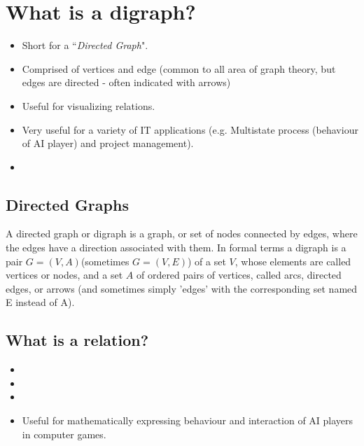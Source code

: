 \documentclass[]{report}
\begin{document}


\section{What is a digraph?}
\begin{itemize}
\item Short for a ``\textit{Directed Graph}".
\item Comprised of vertices and edge (common to all area of graph theory, but edges are directed - often indicated with arrows)
\item Useful for visualizing relations.
\item Very useful for a variety of IT applications (e.g. Multistate process (behaviour of AI player) and project management).
\item 
\end{itemize}
\subsection*{Directed Graphs}
A directed graph or digraph is a graph, or set of nodes connected by edges, where
 the edges have a direction associated with them. In formal terms a digraph is a pair $G=(V,A)$(sometimes $G=(V,E)$) of a set $V$, whose elements are called vertices or nodes, and a set $A$ of ordered pairs of vertices, called arcs, directed edges, or arrows (and sometimes simply 'edges' with the corresponding set named E instead of A).

\subsection{What is a relation?}
\begin{itemize}
\item 
\item 
\item 
\item Useful for mathematically expressing behaviour and interaction of AI players in computer games.
\end{itemize}
\end{document}
